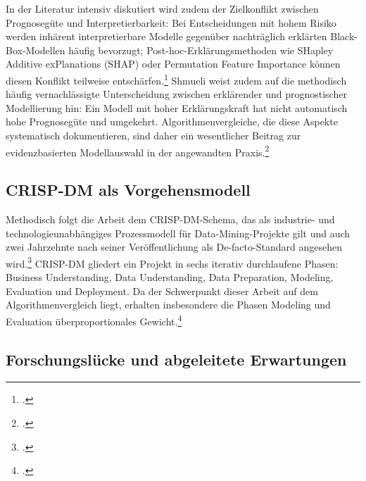 \documentclass[12pt,a4paper]{article}
\begin{document}
In der Literatur intensiv diskutiert wird zudem der Zielkonflikt zwischen Prognosegüte und
Interpretierbarkeit: Bei Entscheidungen mit hohem Risiko werden inhärent interpretierbare Modelle
gegenüber nachträglich erklärten Black-Box-Modellen häufig bevorzugt; Post-hoc-Erklärungsmethoden
wie SHapley Additive exPlanations (SHAP) oder Permutation Feature Importance können diesen Konflikt
teilweise entschärfen.\footcite{Rudin2019} Shmueli weist zudem auf die methodisch häufig
vernachlässigte Unterscheidung zwischen erklärender und prognostischer Modellierung hin: Ein Modell
mit hoher Erklärungskraft hat nicht automatisch hohe Prognosegüte und umgekehrt. Algorithmenvergleiche,
die diese Aspekte systematisch dokumentieren, sind daher ein wesentlicher Beitrag zur
evidenzbasierten Modellauswahl in der angewandten Praxis.\footcite{Shmueli2010}


\subsection{CRISP-DM als Vorgehensmodell}


Methodisch folgt die Arbeit dem CRISP-DM-Schema, das als industrie- und technologieunabhängiges
Prozessmodell für Data-Mining-Projekte gilt und auch zwei Jahrzehnte nach seiner Veröffentlichung
als De-facto-Standard angesehen wird.\footcite[1-2]{Wirth2000} CRISP-DM gliedert ein Projekt in
sechs iterativ durchlaufene Phasen: Business Understanding, Data Understanding, Data Preparation,
Modeling, Evaluation und Deployment. Da der Schwerpunkt dieser Arbeit auf dem Algorithmenvergleich
liegt, erhalten insbesondere die Phasen Modeling und Evaluation überproportionales
Gewicht.\footcite[526-532]{Schroeer2021}


\subsection{Forschungslücke und abgeleitete Erwartungen}
\end{document}
